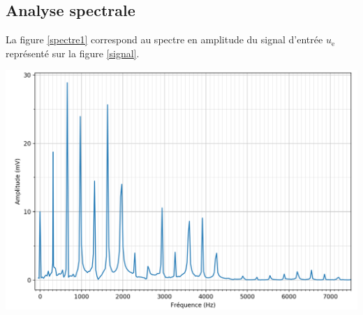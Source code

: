 \documentclass[a4paper,french,bookmarks]{article}
\begin{document}
\subsection{Analyse spectrale}

La figure \ref{spectre1} correspond au spectre en amplitude du signal d'entrée
$u_\text{e}$ représenté sur la figure \ref{signal}.

\begin{center}
	\includegraphics[scale=0.48]{dm6fig/Fig-spectre1.png}
	\label{spectre1}
\end{center}
\end{document}
